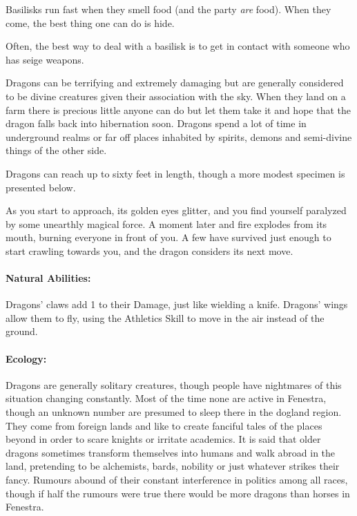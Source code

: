 	Basilisks run fast when they smell food (and the party \emph{are} food).  When they come, the best thing one can do is hide.

	Often, the best way to deal with a basilisk is to get in contact with someone who has seige weapons.

\label{dragon}

\dragon

Dragons can be terrifying and extremely damaging but are generally considered to be divine creatures given their association with the sky.  When they land on a farm there is precious little anyone can do but let them take it and hope that the dragon falls back into hibernation soon.  Dragons spend a lot of time in underground realms or far off places inhabited by spirits, demons and semi-divine things of the other side.

	Dragons can reach up to sixty feet in length, though a more modest specimen is presented below.

\begin{boxtext}

	As you start to approach, its golden eyes glitter, and you find yourself paralyzed by some unearthly magical force.  A moment later and fire explodes from its mouth, burning everyone in front of you.  A few have survived just enough to start crawling towards you, and the dragon considers its next move.

\end{boxtext}

	\paragraph{Natural Abilities:} Dragons' claws add 1 to their Damage, just like wielding a knife.  Dragons' wings allow them to fly, using the Athletics Skill to move in the air instead of the ground.

	\paragraph{Ecology:} Dragons are generally solitary creatures, though people have nightmares of this situation changing constantly.  Most of the time none are active in Fenestra, though an unknown number are presumed to sleep there in the dogland region.  They come from foreign lands and like to create fanciful tales of the places beyond in order to scare knights or irritate academics.  It is said that older dragons sometimes transform themselves into humans and walk abroad in the land, pretending to be alchemists, bards, nobility or just whatever strikes their fancy.  Rumours abound of their constant interference in politics among all races, though if half the rumours were true there would be more dragons than horses in Fenestra.

